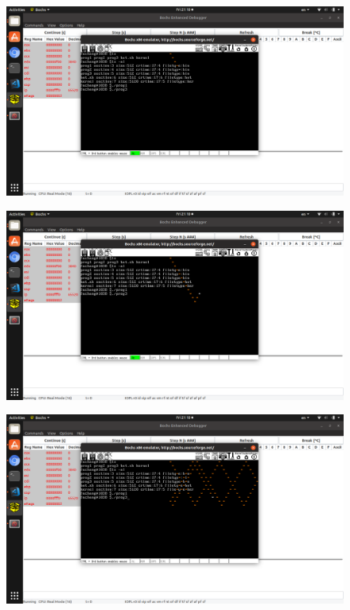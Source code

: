\documentclass[a4paper,11pt,UTF8]{ctexart}
\newcommand{\bottomcaption}{%
\setlength{\abovecaptionskip}{6pt}%
\setlength{\belowcaptionskip}{6pt}%
\caption}
\newcommand{\xiaowuhao}{\fontsize{9pt}{\baselineskip}\selectfont}   %
\begin{document}
  \begin{figure}[!htbp]
    \centering
    \includegraphics[width=\textwidth]{imgs/Screenshot_from_2019-03-29_21-10-48.png}
    \bottomcaption{\xiaowuhao{执行用户三，该小球在原来界面执行}}
  \end{figure}
  \begin{figure}[!htbp]
    \centering
    \includegraphics[width=\textwidth]{imgs/Screenshot_from_2019-03-29_21-10-48_-_1.png}
    \bottomcaption{\xiaowuhao{用户三继续执行}}
  \end{figure}
  \begin{figure}[!htbp]
    \centering
    \includegraphics[width=\textwidth]{imgs/Screenshot_from_2019-03-29_21-10-56.png}
    \bottomcaption{\xiaowuhao{用户三继续执行}}
  \end{figure}
\end{document}
